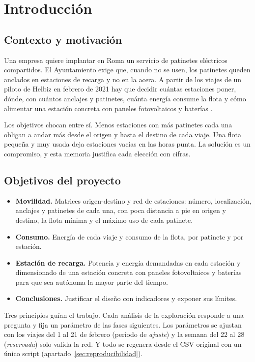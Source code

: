 \documentclass[11pt,a4paper]{article}
\begin{document}
\section{Introducción}

\subsection{Contexto y motivación}
Una empresa quiere implantar en Roma un servicio de patinetes eléctricos compartidos. El
Ayuntamiento exige que, cuando no se usen, los patinetes queden anclados en estaciones de
recarga y no en la acera. A partir de los viajes de un piloto de Helbiz en febrero de 2021
\cite{datos} hay que decidir cuántas estaciones poner, dónde, con cuántos anclajes y
patinetes, cuánta energía consume la flota y cómo alimentar una estación concreta con
paneles fotovoltaicos y baterías \cite{enunciado}.

Los objetivos chocan entre sí. Menos estaciones con más patinetes cada una obligan a andar
más desde el origen y hasta el destino de cada viaje. Una flota pequeña y muy usada deja
estaciones vacías en las horas punta. La solución es un compromiso, y esta memoria justifica
cada elección con cifras.

\subsection{Objetivos del proyecto}
\begin{itemize}
  \item \textbf{Movilidad.} Matrices origen-destino y red de estaciones: número, localización,
        anclajes y patinetes de cada una, con poca distancia a pie en origen y destino, la
        flota mínima y el máximo uso de cada patinete.
  \item \textbf{Consumo.} Energía de cada viaje y consumo de la flota, por patinete y por
        estación.
  \item \textbf{Estación de recarga.} Potencia y energía demandadas en cada estación y
        dimensionado de una estación concreta con paneles fotovoltaicos y baterías para que
        sea autónoma la mayor parte del tiempo.
  \item \textbf{Conclusiones.} Justificar el diseño con indicadores y exponer sus límites.
\end{itemize}
Tres principios guían el trabajo. Cada análisis de la exploración responde a una pregunta y
fija un parámetro de las fases siguientes. Los parámetros se ajustan con los viajes del 1 al
21 de febrero (periodo de \emph{ajuste}) y la semana del 22 al 28 (\emph{reservada}) solo
valida la red. Y todo se regenera desde el CSV original con un único script
(apartado~\ref{sec:reproducibilidad}).
\end{document}
